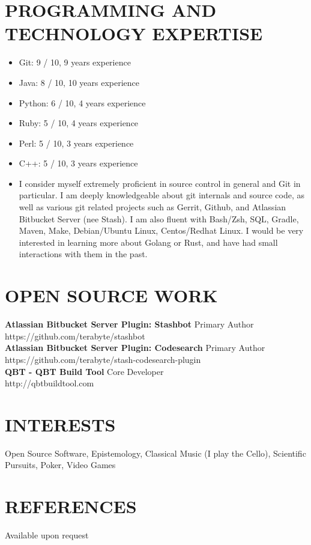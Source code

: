 \documentclass[line, margin]{res}
\begin{document}
\begin{resume}
\section{PROGRAMMING AND TECHNOLOGY EXPERTISE}
\begin{itemize}
\item
Git: 9 / 10, 9 years experience
\item
Java: 8 / 10, 10 years experience
\item
Python: 6 / 10, 4 years experience
\item
Ruby: 5 / 10, 4 years experience
\item
Perl: 5 / 10, 3 years experience
\item
C++: 5 / 10, 3 years experience
\item
I consider myself extremely proficient in source control in general and Git in particular.  I am deeply knowledgeable about git internals and source code, as well as various git related projects such as Gerrit, Github, and Atlassian Bitbucket Server (nee Stash).
I am also fluent with Bash/Zsh, SQL, Gradle, Maven, Make, Debian/Ubuntu Linux, Centos/Redhat Linux.  I would be very interested in learning more about Golang or Rust, and have had small interactions with them in the past.
\end{itemize}

\section{OPEN SOURCE WORK}
{\bf Atlassian Bitbucket Server Plugin: Stashbot} \hfill Primary Author
\\
https://github.com/terabyte/stashbot
\\
{\bf Atlassian Bitbucket Server Plugin: Codesearch} \hfill Primary Author
\\
https://github.com/terabyte/stash-codesearch-plugin
\\
{\bf QBT - QBT Build Tool} \hfill Core Developer
\\
http://qbtbuildtool.com
\\

\section{INTERESTS}
Open Source Software, Epistemology, Classical Music (I play the Cello),
Scientific Pursuits, Poker, Video Games

\section{REFERENCES}
Available upon request

\end{resume}
\end{document}
